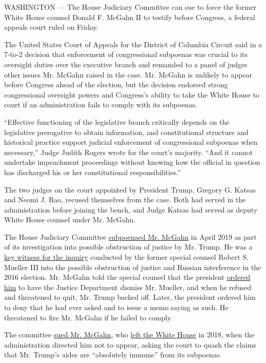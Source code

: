 WASHINGTON --- The House Judiciary Committee can sue to force the former
White House counsel Donald F. McGahn II to testify before Congress, a
federal appeals court ruled on Friday.

The United States Court of Appeals for the District of Columbia Circuit
said in a 7-to-2 decision that enforcement of congressional subpoenas
was crucial to its oversight duties over the executive branch and
remanded to a panel of judges other issues Mr. McGahn raised in the
case. Mr. McGahn is unlikely to appear before Congress ahead of the
election, but the decision endorsed strong congressional oversight
powers and Congress's ability to take the White House to court if an
administration fails to comply with its subpoenas.

``Effective functioning of the legislative branch critically depends on
the legislative prerogative to obtain information, and constitutional
structure and historical practice support judicial enforcement of
congressional subpoenas when necessary,'' Judge Judith Rogers wrote for
the court's majority. ``And it cannot undertake impeachment proceedings
without knowing how the official in question has discharged his or her
constitutional responsibilities.''

The two judges on the court appointed by President Trump, Gregory G.
Katsas and Neomi J. Rao, recused themselves from the case. Both had
served in the administration before joining the bench, and Judge Katsas
had served as deputy White House counsel under Mr. McGahn.

The House Judiciary Committee
\href{https://www.nytimes.com/2019/04/22/us/politics/mcgahn-trump-attacks.html}{subpoenaed
Mr. McGahn} in April 2019 as part of its investigation into possible
obstruction of justice by Mr. Trump. He was a
\href{https://www.nytimes.com/interactive/2019/04/19/us/politics/mueller-report-citations.html}{key
witness for the inquiry} conducted by the former special counsel Robert
S. Mueller III into the possible obstruction of justice and Russian
interference in the 2016 election. Mr. McGahn told the special counsel
that the president
\href{https://www.nytimes.com/2018/01/25/us/politics/trump-mueller-special-counsel-russia.html}{ordered
him} to have the Justice Department dismiss Mr. Mueller, and when he
refused and threatened to quit, Mr. Trump backed off. Later, the
president ordered him to deny that he had ever asked and to issue a memo
saying as such. He threatened to fire Mr. McGahn if he failed to comply.

The committee
\href{https://www.nytimes.com/2019/08/07/us/politics/don-mcgahn-subpoena.html}{sued
Mr. McGahn}, who
\href{https://www.nytimes.com/interactive/2018/03/16/us/politics/all-the-major-firings-and-resignations-in-trump-administration.html}{left
the White House} in 2018, when the administration directed him not to
appear, asking the court to quash the claims that Mr. Trump's aides are
``absolutely immune'' from its subpoenas.


